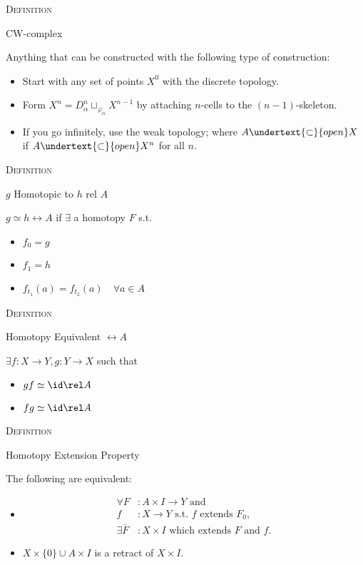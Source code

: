 \documentclass{article}
\newenvironment{flashcard}[2][]{%
\noindent  \textsc{#1}

\vfill 
\centerline{{\Large{#2}}}
\vfill
\newpage \vspace*{\stretch{1}} \noindent
}
{\vspace*{\stretch{1}}\newpage}
\begin{document}
\begin{flashcard}[Definition]{CW-complex}
Anything that can be constructed with the following type of construction: 
\begin{itemize}
\item Start with any set of points $X^0$ with the discrete topology. 
\item Form $X^n= D^n_\alpha \sqcup_{\varphi_\alpha} X^{n-1}$ by attaching $n$-cells to the $(n-1)$-skeleton. 
\item If you go infinitely, use the weak topology; where $A{\undertext{\subset}{open}}{X}$ if $A{\undertext{\subset}{open}}{X^n}$ for all $n$. 
\end{itemize}
\end{flashcard}

\begin{flashcard}[Definition]{$g$ Homotopic to $h$ rel $A$}
$g\simeq h \rel A$ if $\exists$ a homotopy $F$ s.t. 
\begin{itemize}
\item $f_0 = g$
\item $f_1 = h$ 
\item $f_{t_1}(a)=f_{t_2}(a) \quad \forall a\in A$
\end{itemize}
\end{flashcard}

\begin{flashcard}[Definition]{Homotopy Equivalent $\rel A$}
$\exists f:X\to Y, g:Y\to X$ such that 
\begin{itemize}
\item $gf\simeq\id \rel A$
\item $fg\simeq\id \rel A$
\end{itemize}
\end{flashcard}

\begin{flashcard}[Definition]{Homotopy Extension Property}
The following are equivalent:
\begin{itemize}
\item \mbox{} \vspace*{-5ex}\begin{align*}
\forall F&:A\times I \to Y \text{ and }\\
f&: X \to Y \text{ s.t. } f \text{ extends } F_0,\\
\exists \bar{F}&: X\times I \text{ which extends } F \text{ and }f.
\end{align*}

\item $X\times \{0\} \cup A\times I$ is a retract of $X\times I$. 
\end{itemize}
\end{flashcard}
\end{document}
